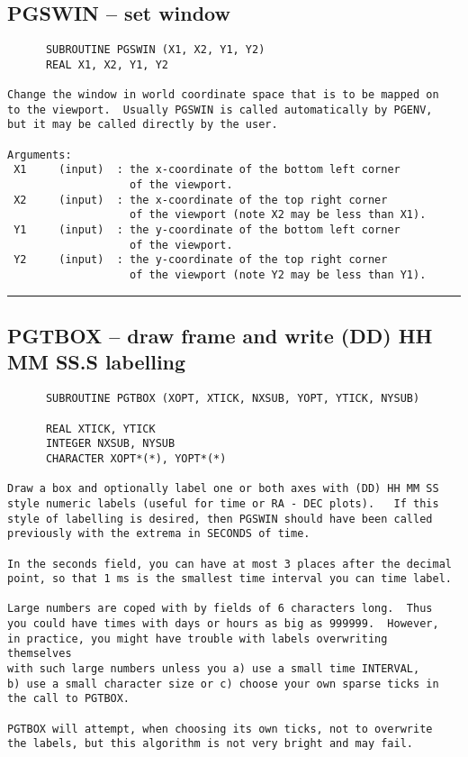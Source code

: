 {\subsection*{PGSWIN -- set window }
\begin{verbatim}
      SUBROUTINE PGSWIN (X1, X2, Y1, Y2)
      REAL X1, X2, Y1, Y2

Change the window in world coordinate space that is to be mapped on
to the viewport.  Usually PGSWIN is called automatically by PGENV,
but it may be called directly by the user.

Arguments:
 X1     (input)  : the x-coordinate of the bottom left corner
                   of the viewport.
 X2     (input)  : the x-coordinate of the top right corner
                   of the viewport (note X2 may be less than X1).
 Y1     (input)  : the y-coordinate of the bottom left corner
                   of the viewport.
 Y2     (input)  : the y-coordinate of the top right corner
                   of the viewport (note Y2 may be less than Y1).
\end{verbatim}
\hrule


\subsection*{PGTBOX -- draw frame and write (DD) HH MM SS.S labelling }
\begin{verbatim}
      SUBROUTINE PGTBOX (XOPT, XTICK, NXSUB, YOPT, YTICK, NYSUB)

      REAL XTICK, YTICK
      INTEGER NXSUB, NYSUB
      CHARACTER XOPT*(*), YOPT*(*)

Draw a box and optionally label one or both axes with (DD) HH MM SS 
style numeric labels (useful for time or RA - DEC plots).   If this 
style of labelling is desired, then PGSWIN should have been called
previously with the extrema in SECONDS of time.

In the seconds field, you can have at most 3 places after the decimal
point, so that 1 ms is the smallest time interval you can time label.

Large numbers are coped with by fields of 6 characters long.  Thus 
you could have times with days or hours as big as 999999.  However, 
in practice, you might have trouble with labels overwriting  themselves
with such large numbers unless you a) use a small time INTERVAL, 
b) use a small character size or c) choose your own sparse ticks in 
the call to PGTBOX.  

PGTBOX will attempt, when choosing its own ticks, not to overwrite
the labels, but this algorithm is not very bright and may fail.


\end{verbatim}}
